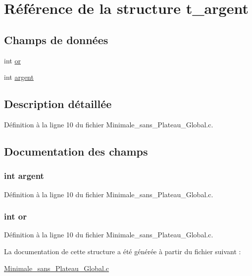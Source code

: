 \hypertarget{structt__argent}{\section{Référence de la structure t\-\_\-argent}
\label{structt__argent}
}
\subsection*{Champs de données}
\begin{DoxyCompactItemize}
\item 
int \hyperlink{structt__argent_ac9861e6f25598b3c0cc625a9d18a908d}{or}
\item 
int \hyperlink{structt__argent_aaf2331208dfb16a05b9f58f27bb24fa9}{argent}
\end{DoxyCompactItemize}


\subsection{Description détaillée}


Définition à la ligne 10 du fichier Minimale\-\_\-sans\-\_\-\-Plateau\-\_\-\-Global.\-c.



\subsection{Documentation des champs}
\hypertarget{structt__argent_aaf2331208dfb16a05b9f58f27bb24fa9}{
\subsubsection[{argent}]{\setlength{\rightskip}{0pt plus 5cm}int argent}}\label{structt__argent_aaf2331208dfb16a05b9f58f27bb24fa9}


Définition à la ligne 10 du fichier Minimale\-\_\-sans\-\_\-\-Plateau\-\_\-\-Global.\-c.

\hypertarget{structt__argent_ac9861e6f25598b3c0cc625a9d18a908d}{
\subsubsection[{or}]{\setlength{\rightskip}{0pt plus 5cm}int or}}\label{structt__argent_ac9861e6f25598b3c0cc625a9d18a908d}


Définition à la ligne 10 du fichier Minimale\-\_\-sans\-\_\-\-Plateau\-\_\-\-Global.\-c.



La documentation de cette structure a été générée à partir du fichier suivant \-:\begin{DoxyCompactItemize}
\item 
\hyperlink{_minimale__sans___plateau___global_8c}{Minimale\-\_\-sans\-\_\-\-Plateau\-\_\-\-Global.\-c}\end{DoxyCompactItemize}

